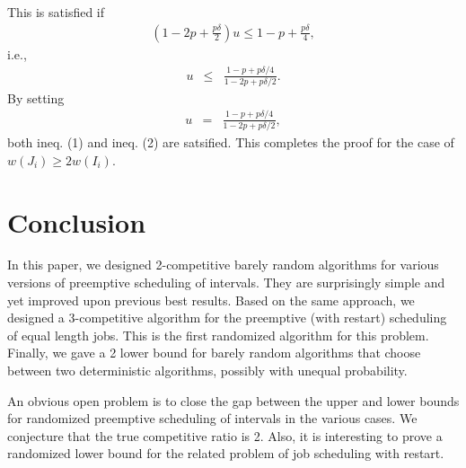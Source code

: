 \documentclass[11pt]{article}
\begin{document}
This is satisfied if
\begin{eqnarray*}
(1 - 2p + \frac{p\delta}{2}) u \leq 1 - p + \frac{p\delta}{4},
\end{eqnarray*}
i.e.,
\begin{eqnarray}
u & \leq & \frac{1 - p + p\delta/4}
                {1 - 2p + p\delta/2}.
\end{eqnarray}
By setting
\begin{eqnarray*}
u & = & \frac{1 -p + p\delta/4}
             {1 -2p + p\delta/2},
\end{eqnarray*}
both ineq. (1) and ineq. (2) are satsified.
This completes the proof for the case of $w(J_i) \geq 2 w(I_i)$.


\section{Conclusion}

In this paper, we designed 2-competitive barely random algorithms
for various versions of preemptive scheduling of intervals.
They are surprisingly simple and yet improved upon previous best
results.
Based on the same approach, we designed a 3-competitive algorithm
for the preemptive (with restart) scheduling of equal length jobs.
This is the first randomized algorithm for this problem.
Finally, we gave a 2 lower bound for barely random algorithms
that choose between two deterministic algorithms, possibly
with unequal probability.

An obvious open problem is to close the gap between the upper and
lower bounds for randomized preemptive scheduling of intervals
in the various cases.
We conjecture that the true competitive ratio is 2.
Also, it is interesting to prove a randomized lower bound for
the related problem of job scheduling with restart.



\end{document}
